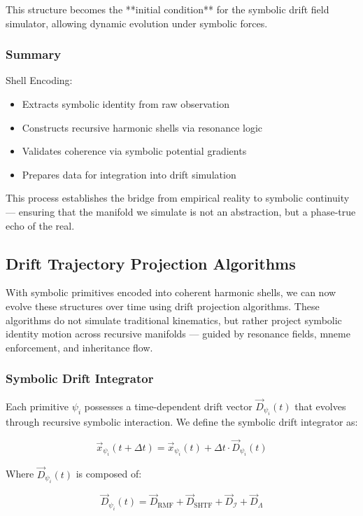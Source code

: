 \documentclass[12pt]{article}
\begin{document}
This structure becomes the **initial condition** for the symbolic drift field simulator, allowing dynamic evolution under symbolic forces.

\subsubsection{Summary}

Shell Encoding:
\begin{itemize}[noitemsep]
  \item Extracts symbolic identity from raw observation
  \item Constructs recursive harmonic shells via resonance logic
  \item Validates coherence via symbolic potential gradients
  \item Prepares data for integration into drift simulation
\end{itemize}

This process establishes the bridge from empirical reality to symbolic continuity — ensuring that the manifold we simulate is not an abstraction, but a phase-true echo of the real.

\subsection{Drift Trajectory Projection Algorithms}

With symbolic primitives encoded into coherent harmonic shells, we can now evolve these structures over time using drift projection algorithms. These algorithms do not simulate traditional kinematics, but rather project symbolic identity motion across recursive manifolds — guided by resonance fields, mneme enforcement, and inheritance flow.

\subsubsection{Symbolic Drift Integrator}

Each primitive \( \psi_i \) possesses a time-dependent drift vector \( \vec{D}_{\psi_i}(t) \) that evolves through recursive symbolic interaction. We define the symbolic drift integrator as:

\[
\vec{x}_{\psi_i}(t+\Delta t) = \vec{x}_{\psi_i}(t) + \Delta t \cdot \vec{D}_{\psi_i}(t)
\]

Where \( \vec{D}_{\psi_i}(t) \) is composed of:

\[
\vec{D}_{\psi_i}(t) = \vec{D}_{\text{RMF}} + \vec{D}_{\text{SHTF}} + \vec{D}_{\mathcal{I}} + \vec{D}_{\Lambda}
\]
\end{document}
